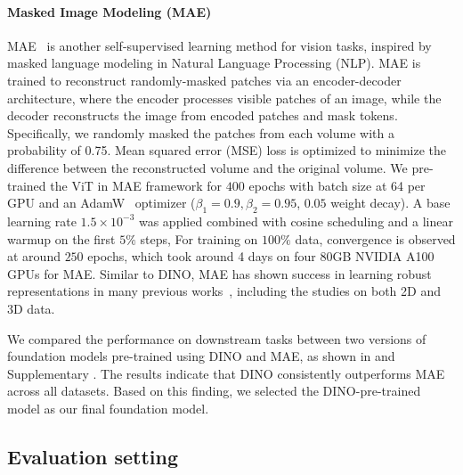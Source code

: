 \documentclass[fleqn,10pt]{wlscirep}
\begin{document}
\paragraph{Masked Image Modeling (MAE)}
MAE~\cite{He2021MaskedAA} is another self-supervised learning method for vision tasks, inspired by masked language modeling in Natural Language Processing (NLP). MAE is trained to reconstruct randomly-masked patches via an encoder-decoder architecture, where the encoder processes visible patches of an image, while the decoder reconstructs the image from encoded patches and mask tokens. Specifically, we randomly masked the patches from each volume with a probability of 0.75. Mean squared error (MSE) loss is optimized to minimize the difference between the reconstructed volume and the original volume. We pre-trained the ViT in MAE framework for $400$ epochs with batch size at 64 per GPU and an AdamW~\cite{loshchilov2018decoupled} optimizer ($\beta_1=0.9, \beta_2=0.95$, $0.05$ weight decay). A base learning rate $1.5\times10^{-3}$ was applied combined with cosine scheduling and a linear warmup on the first $5\%$ steps,  For training on $100\%$ data, convergence is observed at around $250$ epochs, which took around 4 days on four 80GB NVIDIA A100 GPUs for MAE. Similar to DINO, MAE has shown success in learning robust representations in many previous works~\cite{ravi2024sam2, tong2022videomae, gupta2023siamese, zhou23self, huang2022masked, cong2022satmae, chen23masked}, including the studies on both 2D and 3D data.

We compared the performance on downstream tasks between two versions of foundation models pre-trained using DINO and MAE, as shown in  and Supplementary . The results indicate that DINO consistently outperforms MAE across all datasets. Based on this finding, we selected the DINO-pre-trained model as our final foundation model.


\subsection*{Evaluation setting}
\end{document}
